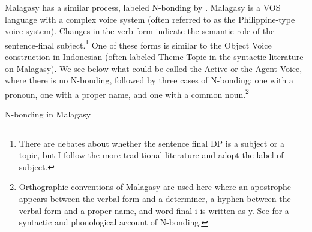 \documentclass[output=paper,colorlinks,citecolor=brown,
]{langscibook}
\begin{document}



Malagasy has a similar process, labeled  N-bonding by \citet{Keenan:2000}.  Malagasy is a VOS language with a complex voice system (often referred to as the Philippine-type voice system).  Changes in the verb form indicate the semantic role of the sentence-final subject.\footnote{There are debates about whether the sentence final DP is a subject or a topic, but I follow the more traditional literature and adopt the label of subject.}  One of these forms is similar to the Object Voice construction in Indonesian (often labeled Theme Topic in the syntactic literature on Malagasy).  We see below what could be called the Active or the Agent Voice, where there is no N-bonding, followed by three cases of N-bonding: one with a pronoun, one with a proper name, and one with a common noun.\footnote{Orthographic conventions of Malagasy are used here where an apostrophe appears between the verbal form and a determiner, a hyphen between the verbal form and a proper name, and word final i is written as y. See \citet{Ting:2021} for a syntactic and phonological account of N-bonding.}

\ea N-bonding in Malagasy
\z
\z
\end{document}
